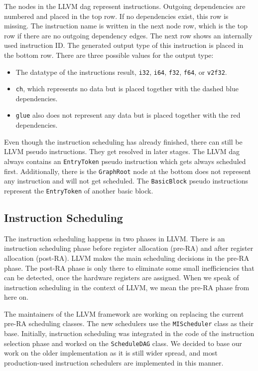 The nodes in the LLVM \ac{dag} represent instructions.
Outgoing dependencies are numbered and placed in the top row.
If no dependencies exist, this row is missing.
The instruction name is written in the next node row, which is the top row if there are no outgoing dependency edges.
The next row shows an internally used instruction ID.
The generated output type of this instruction is placed in the bottom row. 
There are three possible values for the output type:
\begin{itemize}
    \item The datatype of the instructions result, \eg \lstinline|i32|, \lstinline|i64|, \lstinline|f32|, \lstinline|f64|, or \lstinline|v2f32|.
    \item \lstinline|ch|, which represents no data but is placed together with the dashed blue dependencies.
    \item \lstinline|glue| also does not represent any data but is placed together with the red dependencies.
\end{itemize}

Even though the instruction scheduling has already finished, there can still be LLVM pseudo instructions.
They get resolved in later stages.
The LLVM \ac{dag} always contains an \lstinline|EntryToken| pseudo instruction which gets always scheduled first.
Additionally, there is the \lstinline|GraphRoot| node at the bottom does not represent any instruction and will not get scheduled.
The \lstinline|BasicBlock| pseudo instructions represent the \lstinline|EntryToken| of another basic block.

\subsection{Instruction Scheduling}
The instruction scheduling happens in two phases in LLVM.
There is an instruction scheduling phase before register allocation (pre-RA) and after register allocation (post-RA).
LLVM makes the main scheduling decisions in the pre-RA phase.
The post-RA phase is only there to eliminate some small inefficiencies that can be detected, once the hardware registers are assigned.
When we speak of instruction scheduling in the context of LLVM, we mean the pre-RA phase from here on.

The maintainers of the LLVM framework are working on replacing the current pre-RA scheduling classes.
The new schedulers use the \lstinline|MIScheduler| class as their base.
Initially, instruction scheduling was integrated in the code of the instruction selection phase and worked on the \lstinline|ScheduleDAG| class.
We decided to base our work on the older implementation as it is still wider spread, and most production-used instruction schedulers are implemented in this manner.

